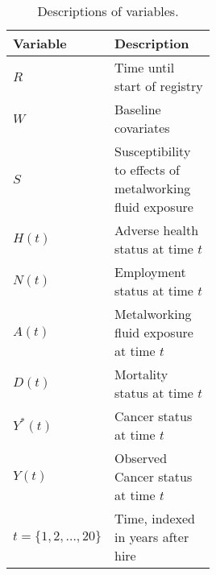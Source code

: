 \documentclass[
  11pt,
]{article}
\begin{document}
\begin{table}
\caption{Descriptions of variables.}\label{tab:variables}
\begin{center}
\begin{tabular}{lp{0.5\linewidth}}
\toprule
 Variable  &  Description                                 \\ \midrule
 $R$       & Time until start of registry \\
 $W$       & Baseline covariates \\
 $S$       & Susceptibility to effects of metalworking fluid exposure \\
 $H(t)$    & Adverse health status at time $t$ \\
 $N(t)$    & Employment status at time $t$ \\
 $A(t)$    & Metalworking fluid exposure at time $t$ \\
 $D(t)$    & Mortality status at time $t$ \\
 $Y^*(t)$  & Cancer status at time $t$ \\
 $Y(t)$    & Observed Cancer status at time $t$ \\
 $t = \{1, 2, \ldots, 20\}$ & Time, indexed in years after hire \\
 \bottomrule
\end{tabular}
\end{center}\end{table}
\end{document}
